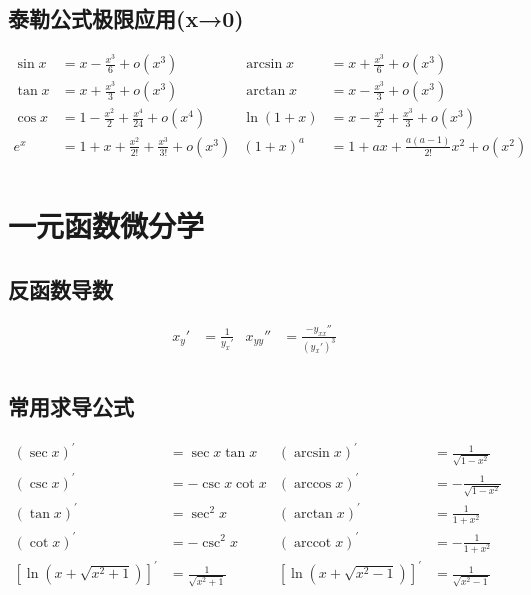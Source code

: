 ﻿\documentclass[a4paper,12pt,UTF8]{ctexart}
\begin{document}
    \subsection{泰勒公式极限应用(x→0)}
    \begin{align*}
        \sin x& = x - \frac{x^{3}}{6} + o(x^{3})& \arcsin x& = x + \frac{x^{3}}{6} + o(x^{3})&\\
        \tan x& = x + \frac{x^{3}}{3} + o(x^{3})& \arctan x& = x - \frac{x^{3}}{3} + o(x^{3})&\\
        \cos x& = 1 - \frac{x^{2}}{2} + \frac{x^{4}}{24} + o(x^{4})& \ln (1+x)& = x - \frac{x^{2}}{2} + \frac{x^{3}}{3} + o(x^{3})&\\
        e^x& = 1 + x + \frac{x^{2}}{2!} + \frac{x^{3}}{3!} + o(x^{3})& (1+x)^{a}& = 1 + ax + \frac{a(a-1)}{2!}x^{2} + o(x^{2})&\\
    \end{align*}

    \section{一元函数微分学}

    \subsection{反函数导数}
    \begin{align*}
        x_y'& = \frac{1}{y_x'}& x_{yy}''& = \frac{-y_{xx}''}{(y_x')^{3}}&\\
    \end{align*}

    \subsection{常用求导公式}
    \begin{align*}
        (\sec x)^{'}& = \sec x\tan x& (\arcsin x)^{'}& = \frac{1}{\sqrt{1-x^{2}}}&\\
        (\csc x)^{'}& = -\csc x\cot x& (\arccos x)^{'}& = -\frac{1}{\sqrt{1-x^{2}}}&\\
        (\tan x)^{'}& = \sec^{2}x& (\arctan x)^{'}& = \frac{1}{1+x^{2}}&\\
        (\cot x)^{'}& = -\csc^{2}x& (\operatorname{arccot} x)^{'}& = -\frac{1}{1+x^{2}}&\\
        [\ln(x+\sqrt{x^{2}+1})]^{'}& = \frac{1}{\sqrt{x^{2}+1}}& [\ln(x+\sqrt{x^{2}-1})]^{'}& = \frac{1}{\sqrt{x^{2}-1}}&\\
    \end{align*}
\end{document}
